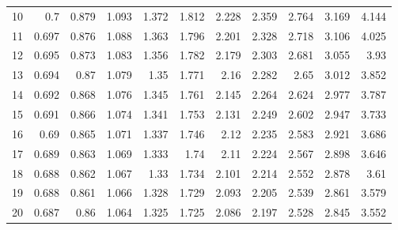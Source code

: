 \begin{center}
\begin{minipage}{5in}
\begin{center}
\begin{tabular}{|r|rrrrrrrrrr|}
10	&\cellcolor{lightgray}	0.7	&\cellcolor{lightgray}	0.879	&\cellcolor{lightgray}	1.093	&\cellcolor{lightgray}	1.372	&\cellcolor{lightgray}	1.812	&\cellcolor{lightgray}	2.228	&\cellcolor{lightgray}	2.359	&\cellcolor{lightgray}	2.764	&\cellcolor{lightgray}	3.169	&\cellcolor{lightgray}	4.144	\\
11	&	0.697	&	0.876	&	1.088	&	1.363	&	1.796	&	2.201	&	2.328	&	2.718	&	3.106	&	4.025	\\
12	&	0.695	&	0.873	&	1.083	&	1.356	&	1.782	&	2.179	&	2.303	&	2.681	&	3.055	&	3.93	\\
13	&	0.694	&	0.87	&	1.079	&	1.35	&	1.771	&	2.16	&	2.282	&	2.65	&	3.012	&	3.852	\\
14	&	0.692	&	0.868	&	1.076	&	1.345	&	1.761	&	2.145	&	2.264	&	2.624	&	2.977	&	3.787	\\
15	&	0.691	&	0.866	&	1.074	&	1.341	&	1.753	&	2.131	&	2.249	&	2.602	&	2.947	&	3.733	\\
16	&\cellcolor{lightgray}	0.69	&\cellcolor{lightgray}	0.865	&\cellcolor{lightgray}	1.071	&\cellcolor{lightgray}	1.337	&\cellcolor{lightgray}	1.746	&\cellcolor{lightgray}	2.12	&\cellcolor{lightgray}	2.235	&\cellcolor{lightgray}	2.583	&\cellcolor{lightgray}	2.921	&\cellcolor{lightgray}	3.686	\\
17	&\cellcolor{lightgray}	0.689	&\cellcolor{lightgray}	0.863	&\cellcolor{lightgray}	1.069	&\cellcolor{lightgray}	1.333	&\cellcolor{lightgray}	1.74	&\cellcolor{lightgray}	2.11	&\cellcolor{lightgray}	2.224	&\cellcolor{lightgray}	2.567	&\cellcolor{lightgray}	2.898	&\cellcolor{lightgray}	3.646	\\
18	&\cellcolor{lightgray}	0.688	&\cellcolor{lightgray}	0.862	&\cellcolor{lightgray}	1.067	&\cellcolor{lightgray}	1.33	&\cellcolor{lightgray}	1.734	&\cellcolor{lightgray}	2.101	&\cellcolor{lightgray}	2.214	&\cellcolor{lightgray}	2.552	&\cellcolor{lightgray}	2.878	&\cellcolor{lightgray}	3.61	\\
19	&\cellcolor{lightgray}	0.688	&\cellcolor{lightgray}	0.861	&\cellcolor{lightgray}	1.066	&\cellcolor{lightgray}	1.328	&\cellcolor{lightgray}	1.729	&\cellcolor{lightgray}	2.093	&\cellcolor{lightgray}	2.205	&\cellcolor{lightgray}	2.539	&\cellcolor{lightgray}	2.861	&\cellcolor{lightgray}	3.579	\\
20	&\cellcolor{lightgray}	0.687	&\cellcolor{lightgray}	0.86	&\cellcolor{lightgray}	1.064	&\cellcolor{lightgray}	1.325	&\cellcolor{lightgray}	1.725	&\cellcolor{lightgray}	2.086	&\cellcolor{lightgray}	2.197	&\cellcolor{lightgray}	2.528	&\cellcolor{lightgray}	2.845	&\cellcolor{lightgray}	3.552	\\

\end{tabular}
\end{center}
\end{minipage}
\end{center}
